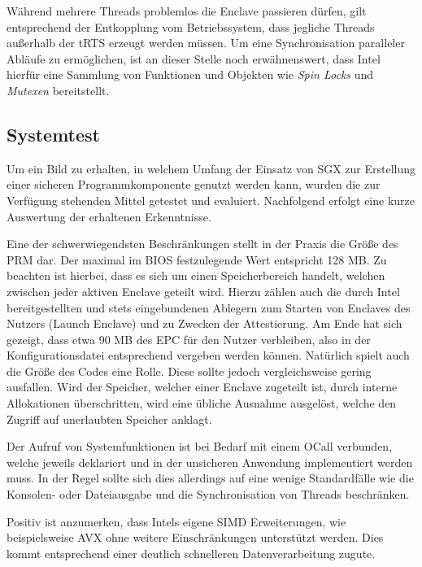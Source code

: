Während mehrere Threads problemlos die Enclave passieren dürfen, gilt entsprechend der Entkopplung vom Betriebssystem, dass jegliche Threads außerhalb der \ac{tRTS} erzeugt werden müssen. Um eine Synchronisation paralleler Abläufe zu ermöglichen, ist an dieser Stelle noch erwähnenswert, dass Intel hierfür eine Sammlung von Funktionen und Objekten wie \textit{Spin Locks} und \textit{Mutexen} bereitstellt.

\subsection{Systemtest}

Um ein Bild zu erhalten, in welchem Umfang der Einsatz von \ac{SGX} zur Erstellung einer sicheren Programmkomponente genutzt werden kann, wurden die zur Verfügung stehenden Mittel getestet und evaluiert. Nachfolgend erfolgt eine kurze Auswertung der erhaltenen Erkenntnisse.

Eine der schwerwiegendsten Beschränkungen stellt in der Praxis die Größe des PRM dar. Der maximal im BIOS festzulegende Wert entspricht 128 MB. Zu beachten ist hierbei, dass es sich um einen Speicherbereich handelt, welchen zwischen jeder aktiven Enclave geteilt wird. Hierzu zählen auch die durch Intel bereitgestellten und stets eingebundenen Ablegern zum Starten von Enclaves des Nutzers (Launch Enclave) und zu Zwecken der Attestierung. Am Ende hat sich gezeigt, dass etwa 90 MB des \ac{EPC} für den Nutzer verbleiben, also in der Konfigurationsdatei entsprechend vergeben werden können. Natürlich spielt auch die Größe des Codes eine Rolle. Diese sollte jedoch vergleichsweise gering ausfallen. Wird der Speicher, welcher einer Enclave zugeteilt ist, durch interne Allokationen überschritten, wird eine übliche Ausnahme ausgelöst, welche den Zugriff auf unerlaubten Speicher anklagt.

Der Aufruf von Systemfunktionen ist bei Bedarf mit einem \ac{OCall} verbunden, welche jeweils deklariert und in der unsicheren Anwendung implementiert werden muss. In der Regel sollte sich dies allerdings auf eine wenige Standardfälle wie die Konsolen- oder Dateiausgabe und die Synchronisation von Threads beschränken.

Positiv ist anzumerken, dass Intels eigene \ac{SIMD} Erweiterungen, wie beispielsweise \ac{AVX} ohne weitere Einschränkungen unterstützt werden. Dies kommt entsprechend einer deutlich schnelleren Datenverarbeitung zugute.

